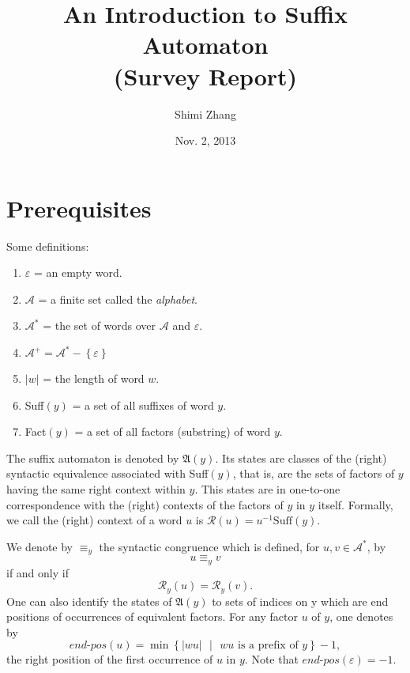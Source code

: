 \documentclass[11pt]{report}
\begin{document}
\title{An Introduction to Suffix Automaton\\(Survey Report)}
\author{Shimi Zhang}
\date{Nov. 2, 2013}
\maketitle

\chapter{Prerequisites}

Some definitions:
\begin{enumerate}
\item $\varepsilon$ = an empty word.
\item $\mathcal{A}$ = a finite set called the \textit{alphabet}.
\item $\mathcal{A}^*$ = the set of words over $\mathcal{A}$ and
  $\varepsilon$.
\item $\mathcal{A}^+ = \mathcal{A}^* - \left\{\varepsilon\right\}$
\item $|w|$ = the length of word $w$.
\item Suff$(y)$ = a set of all suffixes of word $y$.
\item Fact$(y)$ = a set of all factors (substring) of word $y$. 
\end{enumerate}
The suffix automaton is denoted by $\mathfrak{A}(y)$. Its states are
classes of the (right) syntactic equivalence associated with
Suff\((y)\), that is, are the sets of factors of \(y\) having the same
right context within \(y\). This states are in one-to-one
correspondence with the (right) contexts of the factors of \(y\) in
\(y\) itself. Formally, we call the (right) context of a word \(u\) is
\(\mathcal{R}(u)=u^{-1}\text{Suff}(y)\). 

We denote by \(\equiv_y\) the syntactic congruence which is defined, for \(u,v \in \mathcal{A}^*\), by$$u \equiv_y v$$ if and only if $$\mathcal{R}_y(u) = \mathcal{R}_y(v).$$ One can also identify the states of \(\mathfrak{A}(y)\) to sets of indices on y which are end positions of occurrences of equivalent factors. For any factor \(u\) of \(y\), one denotes by $$\textit{end-pos}(u) = \min\left\{|wu|\text{ }|\text{ }wu \text{ is a prefix of } y\right\} - 1,$$ the right position of the first occurrence of \(u\) in \(y\). Note that \(\textit{end-pos}(\varepsilon)=-1\).
\end{document}
